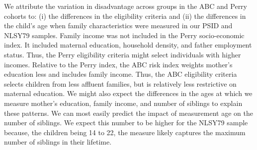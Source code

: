 We attribute the variation in disadvantage across groups in the ABC and Perry cohorts to: (i) the differences in the eligibility criteria and (ii) the differences in the child's age when family characteristics were measured in our PSID and NLSY79 samples. Family income was not included in the Perry socio-economic index. It included maternal education, household density, and father employment status. Thus, the Perry eligibility criteria might select individuals with higher incomes. Relative to the Perry index, the ABC risk index weights mother's education less and includes family income. Thus, the ABC eligibility criteria selects children from less affluent families, but is relatively less restrictive on maternal education. We might also expect the differences in the ages at which we measure mother's education, family income, and number of siblings to explain these patterns. We can most easily predict the impact of measurement age on the number of siblings. We expect this number to be higher for the NLSY79 sample because, the children being 14 to 22, the measure likely captures the maximum number of siblings in their lifetime. 



